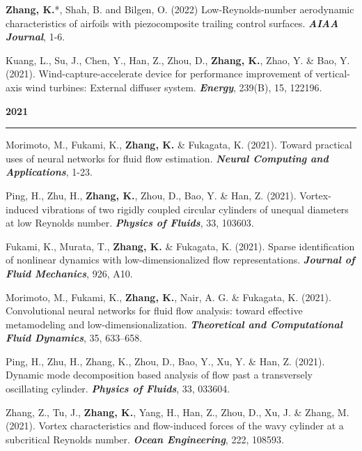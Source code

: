 \documentclass[10pt]{article}
\begin{document}
{\begin{etaremune}
  \item \textbf{Zhang, K.}*, Shah, B. and Bilgen, O. (2022) Low-Reynolds-number aerodynamic characteristics of airfoils with piezocomposite trailing control surfaces. \textit{\textbf{AIAA Journal}}, 1-6.

	\item Kuang, L., Su, J., Chen, Y., Han, Z., Zhou, D., \textbf{Zhang, K.}, Zhao, Y. \& Bao, Y. (2021). Wind-capture-accelerate device for performance improvement of vertical-axis wind turbines: External diffuser system. \textit{\textbf{Energy}}, 239(B), 15, 122196. 

\item [] {\bf \color{Blue} 2021 \rule{14.8cm}{0.2mm}}


  \item Morimoto, M., Fukami, K., \textbf{Zhang, K.} \& Fukagata, K. (2021). Toward practical uses of neural networks for fluid flow estimation. \textit{\textbf{Neural Computing and Applications}}, 1-23.



  \item Ping, H., Zhu, H., \textbf{Zhang, K.}, Zhou, D., Bao, Y. \& Han, Z. (2021). Vortex-induced vibrations of two rigidly coupled circular cylinders of unequal diameters at low Reynolds number. \textit{\textbf{Physics of Fluids}}, 33, 103603. 
  
  \item Fukami, K., Murata, T., \textbf{Zhang, K.} \& Fukagata, K. (2021). Sparse identification of nonlinear dynamics with low-dimensionalized flow representations. \textit{\textbf{Journal of Fluid Mechanics}}, 926, A10.
  
  \item Morimoto, M., Fukami, K., \textbf{Zhang, K.}, Nair, A. G. \& Fukagata, K. (2021). Convolutional neural networks for fluid flow analysis: toward effective metamodeling and low-dimensionalization. \textit{\textbf{Theoretical and Computational Fluid Dynamics}}, 35, 633–658.



  \item Ping, H., Zhu, H., Zhang, K., Zhou, D., Bao, Y., Xu, Y. \& Han, Z. (2021). Dynamic mode decomposition based analysis of flow past a transversely oscillating cylinder. \textit{\textbf{Physics of Fluids}}, 33, 033604. 
  
  \item Zhang, Z., Tu, J., \textbf{Zhang, K.}, Yang, H., Han, Z., Zhou, D., Xu, J. \& Zhang, M. (2021). Vortex characteristics and flow-induced forces of the wavy cylinder at a subcritical Reynolds number. \textit{\textbf{Ocean Engineering}}, 222, 108593.
  

\end{etaremune}}
\end{document}
